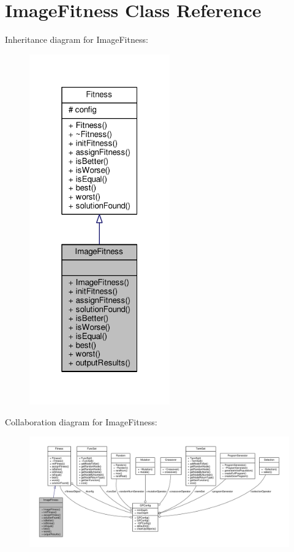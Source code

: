 \hypertarget{classImageFitness}{}\section{Image\+Fitness Class Reference}
\label{classImageFitness}


Inheritance diagram for Image\+Fitness\+:
\nopagebreak
\begin{figure}[H]
\begin{center}
\leavevmode
\includegraphics[width=172pt]{classImageFitness__inherit__graph}
\end{center}
\end{figure}


Collaboration diagram for Image\+Fitness\+:
\nopagebreak
\begin{figure}[H]
\begin{center}
\leavevmode
\includegraphics[width=350pt]{classImageFitness__coll__graph}
\end{center}
\end{figure}
